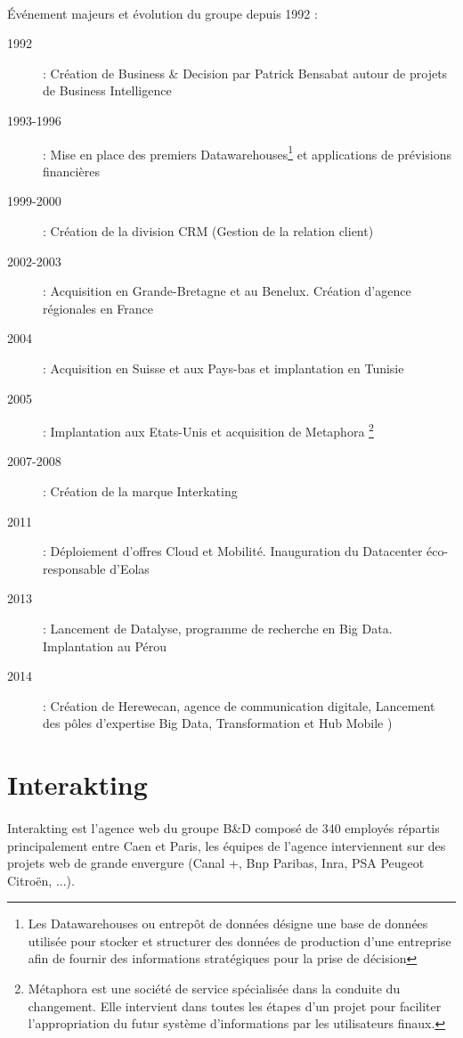         \paragraph{}
       	  Événement majeurs et évolution du groupe depuis 1992 : 
       	  \begin{description}
       	  \item[1992] : Création de Business \& Decision par Patrick Bensabat autour de projets de Business Intelligence
       	  \item[1993-1996] : Mise en place des premiers Datawarehouses\footnote{Les Datawarehouses ou entrepôt de données désigne une base de données utilisée pour stocker et structurer des données de production d'une entreprise afin de fournir des informations stratégiques pour la prise de décision} et applications de prévisions financières
       	  \item[1999-2000] : Création de la division CRM (Gestion de la relation client)
       	  \item[2002-2003] : Acquisition en Grande-Bretagne et au Benelux. Création d'agence régionales en France
       	  \item[2004] : Acquisition en Suisse et aux Pays-bas et implantation en Tunisie
       	  \item[2005] : Implantation aux Etats-Unis et acquisition de Metaphora \footnote{Métaphora est une société de service spécialisée dans la conduite du changement. Elle intervient dans toutes les étapes d’un projet pour faciliter l’appropriation du futur système d’informations par les utilisateurs finaux.}
       	  \item[2007-2008] : Création de la marque Interkating
       	  \item[2011] : Déploiement d'offres Cloud et Mobilité. Inauguration du Datacenter éco-responsable d'Eolas
       	  \item[2013] : Lancement de Datalyse, programme de recherche en Big Data. Implantation au Pérou
       	  \item[2014] : Création de Herewecan, agence de communication digitale, Lancement des pôles d'expertise Big Data, Transformation et Hub Mobile )
       	  \end{description}
       	  
\section{Interakting}

        \paragraph{}
        Interakting est l'agence web du groupe B\&D  composé de 340 employés répartis principalement entre Caen et Paris, les équipes de l'agence interviennent sur des projets web  de grande envergure (Canal +, Bnp Paribas, Inra, PSA Peugeot Citroën, ...).
        
